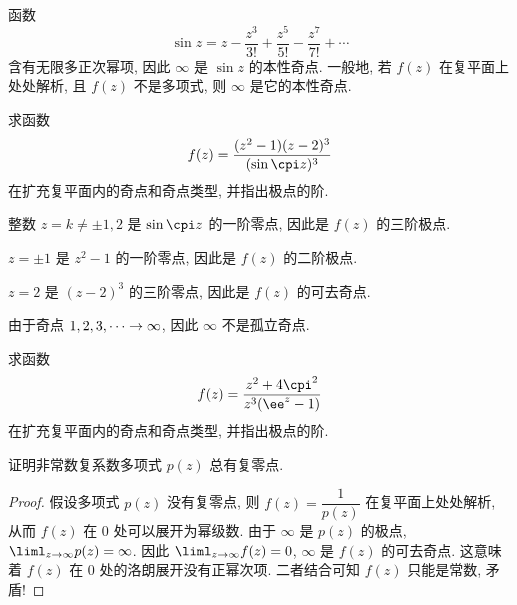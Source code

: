 \begin{example}
  函数 
  \[
    \sin z=z-\frac{z^3}{3!}+\frac{z^5}{5!}-\frac{z^7}{7!}+\cdots
  \]
  含有无限多正次幂项, 因此 $\infty$ 是 $\sin z$ 的本性奇点.
  一般地, 若 $f(z)$ 在复平面上处处解析, 且 $f(z)$ 不是多项式, 则 $\infty$ 是它的本性奇点.
\end{example}

\begin{example}
  求函数
  \[
    f(z)=\dfrac{(z^2-1)(z-2)^3}{(\sin{\cpi z})^3}
  \]
  在扩充复平面内的奇点和奇点类型, 并指出极点的阶.
\end{example}

\begin{solution}\delspace
  \begin{enumnopar}[(i)]
    \item 整数 $z=k\neq \pm1,2$ 是 $\sin{\cpi z}$ 的一阶零点, 因此是 $f(z)$ 的三阶极点.
    \item $z=\pm1$ 是 $z^2-1$ 的一阶零点, 因此是 $f(z)$ 的二阶极点.
    \item $z=2$ 是 $(z-2)^3$ 的三阶零点, 因此是 $f(z)$ 的可去奇点.
    \item 由于奇点 $1,2,3,\cdots\rightarrow \infty$, 因此 $\infty$ 不是孤立奇点.
  \end{enumnopar}
\end{solution}

\begin{exercise}
  求函数
  \[
    f(z)=\dfrac{z^2+4\cpi^2}{z^3(\ee^z-1)}
  \]
  在扩充复平面内的奇点和奇点类型, 并指出极点的阶.
\end{exercise}

\begin{example}[代数学基本定理]
  \label{exam:algebraic-basic-theorem}
  证明非常数复系数多项式 $p(z)$ 总有复零点.\footnotemark
\end{example}

\begin{proof}
  假设多项式 $p(z)$ 没有复零点, 则 $f(z)=\dfrac1{p(z)}$ 在复平面上处处解析, 从而 $f(z)$ 在 $0$ 处可以展开为幂级数.
  由于 $\infty$ 是 $p(z)$ 的极点, $\liml_{z\ra\infty}p(z)=\infty$.
  因此 $\liml_{z\ra\infty}f(z)=0$, $\infty$ 是 $f(z)$ 的可去奇点.
  这意味着 $f(z)$ 在 $0$ 处的洛朗展开没有正幂次项.
  二者结合可知 $f(z)$ 只能是常数, 矛盾!
\end{proof}




